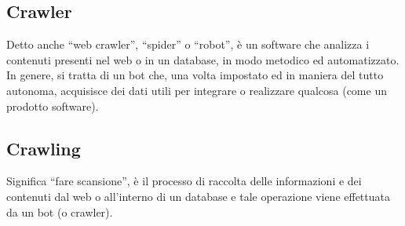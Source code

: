 \subsection{Crawler} Detto anche “web crawler”, “spider” o “robot”, è un software che analizza i contenuti presenti nel web o in un database, in modo metodico ed automatizzato. In genere, si tratta di un bot che, una volta impostato ed in maniera del tutto autonoma, acquisisce dei dati utili per integrare o realizzare qualcosa (come un prodotto software). 

\subsection{Crawling} Significa “fare scansione”, è il processo di raccolta delle informazioni e dei contenuti dal web o all’interno di un database e tale operazione viene effettuata da un bot (o crawler). 








\clearpage